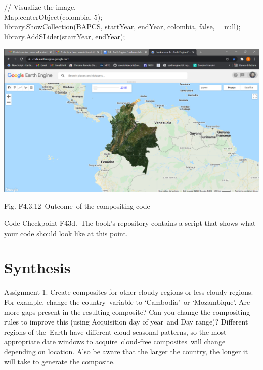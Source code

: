\documentclass[
  letterpaper,
  DIV=11,
  numbers=noendperiod]{scrreprt}
\begin{document}
// Visualize the image.\\
Map.centerObject(colombia, 5);\\
library.ShowCollection(BAPCS, startYear, endYear, colombia, false,~
~null);\\
library.AddSLider(startYear, endYear);

\includegraphics{./F4/image11.png}

Fig. F4.3.12~Outcome~of the compositing code

\begin{tcolorbox}[enhanced jigsaw, left=2mm, breakable, rightrule=.15mm, opacityback=0, colframe=quarto-callout-note-color-frame, colbacktitle=quarto-callout-note-color!10!white, arc=.35mm, opacitybacktitle=0.6, toptitle=1mm, colback=white, leftrule=.75mm, title=\textcolor{quarto-callout-note-color}{\faInfo}\hspace{0.5em}{Note}, toprule=.15mm, bottomtitle=1mm, titlerule=0mm, bottomrule=.15mm, coltitle=black]

Code Checkpoint F43d.~The book's repository contains a script that shows
what your code should look like at this point.

\end{tcolorbox}

\hypertarget{synthesis-6}{%
\section*{Synthesis}\label{synthesis-6}}


Assignment 1. Create composites for other cloudy regions or less cloudy
regions. For example, change the country~variable to `Cambodia'~or
`Mozambique'. Are more gaps present in the resulting composite? Can you
change the compositing rules to improve this (using Acquisition day of
year~and Day range)? Different regions of the~Earth have different cloud
seasonal patterns, so the most appropriate date windows to
acquire~cloud-free composites~will change depending on location. Also be
aware that the larger the country, the longer it will take to generate
the composite.
\end{document}
